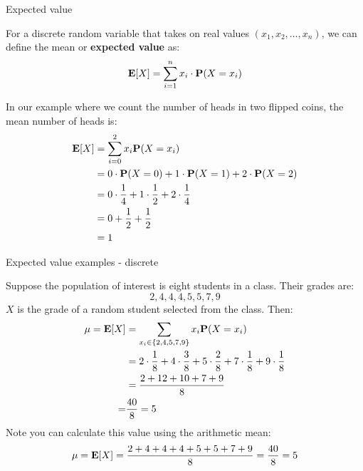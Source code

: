\documentclass[compress, 8pt]{beamer}
\begin{document}
\begin{frame}{Expected value}

For a discrete random variable that takes on real values $(x_1, x_2, \dots, x_n)$, we can define the mean or \textbf{expected value} as:
\begin{equation*}
\mathbf{E} [X] = \sum_{i=1}^n x_i \cdot \mathbf{P} (X = x_i)   
\end{equation*}


In our example where we count the number of heads in two flipped coins, the mean number of heads is: 
\begin{align*}
    \mathbf{E} [X] &= \sum_{i=0}^2 x_i \mathbf{P} (X = x_i) \\
    &= 0 \cdot \mathbf{P} (X = 0) + 1 \cdot \mathbf{P} (X = 1) + 2 \cdot \mathbf{P} (X = 2) \\
    &= 0 \cdot \frac{1}{4} + 1 \cdot \frac{1}{2} + 2 \cdot \frac{1}{4} \\
    &= 0 + \frac{1}{2} + \frac{1}{2} \\
    &= 1
\end{align*}
\end{frame}


\begin{frame}{Expected value examples - discrete}

Suppose the population of interest is eight students in a class. Their grades are:
\begin{equation*}
    2, 4, 4, 4, 5, 5, 7, 9
\end{equation*}
$X$ is the grade of a random student selected from the class. Then:
\begin{align*}
    \mu = \mathbf{E} [X] &= \sum_{x_i \in\{2, 4, 5, 7, 9\}} x_i \mathbf{P} (X = x_i) \\
    &= 2 \cdot \frac{1}{8} + 4 \cdot \frac{3}{8} + 5 \cdot \frac{2}{8} + 7 \cdot \frac{1}{8} + 9 \cdot \frac{1}{8} \\
    &= \frac{2 + 12 + 10 + 7 + 9}{8} \\
    =& \frac{40}{8} = 5
\end{align*}
Note you can calculate this value using the arithmetic mean: 
\begin{equation*}
    \mu = \mathbf{E} [X] = \frac{2 + 4+4+4+5+5+7+9}{8} = \frac{40}{8} = 5
\end{equation*}

\end{frame}
\end{document}
